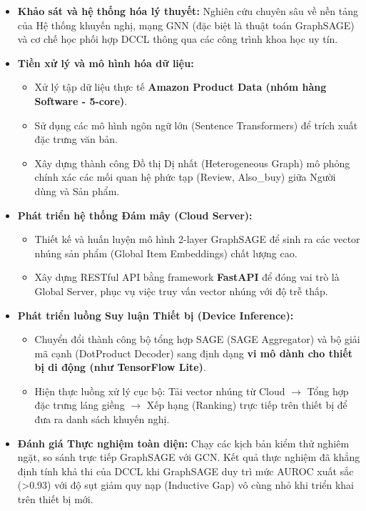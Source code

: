 \begin{itemize}
    \item \textbf{Khảo sát và hệ thống hóa lý thuyết:} Nghiên cứu chuyên sâu về nền tảng của Hệ thống khuyến nghị, mạng GNN (đặc biệt là thuật toán GraphSAGE) và cơ chế học phối hợp DCCL thông qua các công trình khoa học uy tín.
    
    \item \textbf{Tiền xử lý và mô hình hóa dữ liệu:} 
    \begin{itemize}
        \item Xử lý tập dữ liệu thực tế \textbf{Amazon Product Data (nhóm hàng Software - 5-core)}.
        \item Sử dụng các mô hình ngôn ngữ lớn (Sentence Transformers) để trích xuất đặc trưng văn bản.
        \item Xây dựng thành công Đồ thị Dị nhất (Heterogeneous Graph) mô phỏng chính xác các mối quan hệ phức tạp (Review, Also\_buy) giữa Người dùng và Sản phẩm.
    \end{itemize}
    
    \item \textbf{Phát triển hệ thống Đám mây (Cloud Server):}
    \begin{itemize}
        \item Thiết kế và huấn luyện mô hình 2-layer GraphSAGE để sinh ra các vector nhúng sản phẩm (Global Item Embeddings) chất lượng cao.
        \item Xây dựng RESTful API bằng framework \textbf{FastAPI} để đóng vai trò là Global Server, phục vụ việc truy vấn vector nhúng với độ trễ thấp.
    \end{itemize}
    
    \item \textbf{Phát triển luồng Suy luận Thiết bị (Device Inference):}
    \begin{itemize}
        \item Chuyển đổi thành công bộ tổng hợp SAGE (SAGE Aggregator) và bộ giải mã cạnh (DotProduct Decoder) sang định dạng \textbf{vi mô dành cho thiết bị di động (như TensorFlow Lite)}.
        \item Hiện thực luồng xử lý cục bộ: Tải vector nhúng từ Cloud $\rightarrow$ Tổng hợp đặc trưng láng giềng $\rightarrow$ Xếp hạng (Ranking) trực tiếp trên thiết bị để đưa ra danh sách khuyến nghị.
    \end{itemize}
    
    \item \textbf{Đánh giá Thực nghiệm toàn diện:} Chạy các kịch bản kiểm thử nghiêm ngặt, so sánh trực tiếp GraphSAGE với GCN. Kết quả thực nghiệm đã khẳng định tính khả thi của DCCL khi GraphSAGE duy trì mức AUROC xuất sắc (>0.93) với độ sụt giảm quy nạp (Inductive Gap) vô cùng nhỏ khi triển khai trên thiết bị mới.
\end{itemize}

